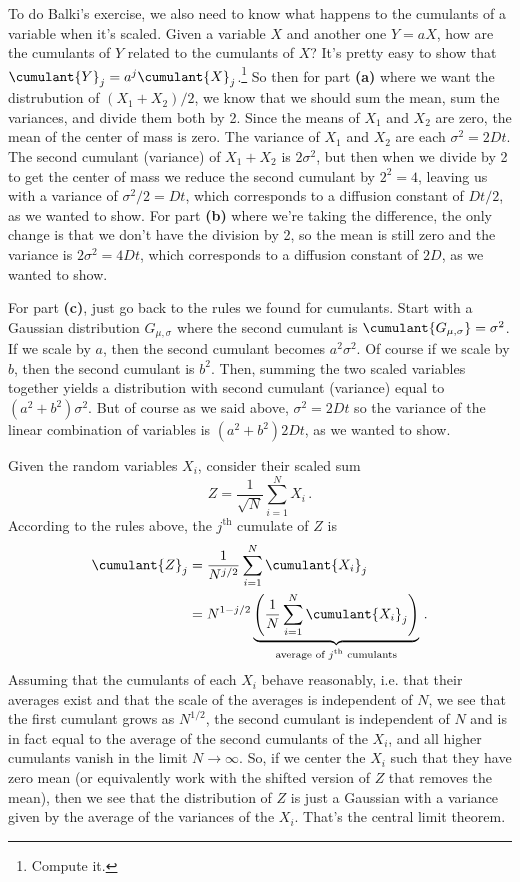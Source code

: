 To do Balki's exercise, we also need to know what happens to the cumulants of a variable when it's scaled.
Given a variable $X$ and another one $Y = a X$, how are the cumulants of $Y$ related to the cumulants of $X$?
It's pretty easy to show that $\cumulant{Y}_j = a^j \cumulant{X}_j$.\footnote{Compute it.}
So then for part \textbf{(a)} where we want the distrubution of $(X_1 + X_2) / 2$, we know that we should sum the mean, sum the variances, and divide them both by 2.
Since the means of $X_1$ and $X_2$ are zero, the mean of the center of mass is zero.
The variance of $X_1$ and $X_2$ are each $\sigma^2 = 2 D t$.
The second cumulant (variance) of $X_1 + X_2$ is $2 \sigma^2$, but then when we divide by 2 to get the center of mass we reduce the second cumulant by $2^2 = 4$, leaving us with a variance of $\sigma^2 / 2 = D t$, which corresponds to a diffusion constant of $D t / 2$, as we wanted to show.
For part \textbf{(b)} where we're taking the difference, the only change is that we don't have the division by 2, so the mean is still zero and the variance is $2 \sigma^2 = 4 D t$, which corresponds to a diffusion constant of $2D$, as we wanted to show.

For part \textbf{(c)}, just go back to the rules we found for cumulants.
Start with a Gaussian distribution $G_{\mu, \sigma}$ where the second cumulant is $\cumulant{G_{\mu, \sigma}} = \sigma^2$.
If we scale by $a$, then the second cumulant becomes $a^2 \sigma^2$.
Of course if we scale by $b$, then the second cumulant is $b^2$.
Then, summing the two scaled variables together yields a distribution with second cumulant (variance) equal to $(a^2 + b^2) \sigma^2$.
But of course as we said above, $\sigma^2 = 2 D t$ so the variance of the linear combination of variables is $(a^2 + b^2) 2 D t$, as we wanted to show.


Given the random variables $X_i$, consider their scaled sum
\begin{equation*}
  Z = \frac{1}{\sqrt{N}}\sum_{i=1}^N X_i
  \, .
\end{equation*}
According to the rules above, the $j^\text{th}$ cumulate of $Z$ is
\begin{align*}
  \cumulant{Z}_j
  &= \frac{1}{N^{j/2}} \sum_{i=1}^N \cumulant{X_i}_j \\
  &= N^{1 - j/2} \underbrace{\left( \frac{1}{N} \sum_{i=1}^N \cumulant{X_i}_j \right)}_\text{average of $j^\text{th}$ cumulants}
  \, .
\end{align*}
Assuming that the cumulants of each $X_i$ behave reasonably, i.e. that their averages exist and that the scale of the averages is independent of $N$, we see that the first cumulant grows as $N^{1/2}$, the second cumulant is independent of $N$ and is in fact equal to the average of the second cumulants of the $X_i$, and all higher cumulants vanish in the limit $N \rightarrow \infty$.
So, if we center the $X_i$ such that they have zero mean (or equivalently work with the shifted version of $Z$ that removes the mean), then we see that the distribution of $Z$ is just a Gaussian with a variance given by the average of the variances of the $X_i$.
That's the central limit theorem.
